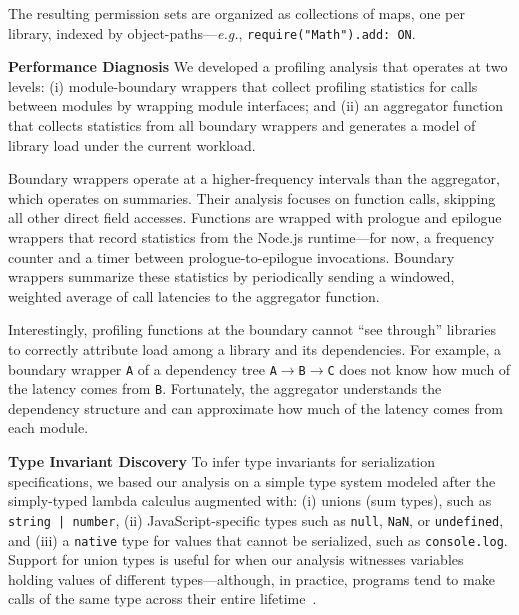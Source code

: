 \documentclass[letterpaper,twocolumn,10pt]{article}
\def\eg{{\em e.g.}, }
\newcommand{\heading}[1]{\vspace{2pt}\noindent\textbf{#1}\enspace}
\newcommand{\ttt}[1]{\texttt{#1}}
\begin{document}
The resulting permission sets are organized as collections of maps, one per library, indexed by object-paths---\eg \ttt{require("Math").add: ON}.

\heading{Performance Diagnosis}
We developed a profiling analysis that operates at two levels:
 (i) module-boundary wrappers that collect profiling statistics for calls between modules by wrapping module interfaces; and
 (ii) an aggregator function that collects statistics from all boundary wrappers and generates a model of library load under the current workload.

Boundary wrappers operate at a higher-frequency intervals than the aggregator, which operates on summaries.
Their analysis focuses on function calls, skipping all other direct field accesses.
Functions are wrapped with prologue and epilogue wrappers that record statistics from the Node.js runtime---for now, a frequency counter and a timer between prologue-to-epilogue invocations.
Boundary wrappers summarize these statistics by periodically sending a windowed, weighted average of call latencies to the aggregator function.


Interestingly, profiling functions at the boundary cannot ``see through'' libraries to correctly attribute load among a library and its dependencies.
For example, a boundary wrapper \ttt{A} of a dependency tree \ttt{A}$\rightarrow$\ttt{B}$\rightarrow$\ttt{C} does not know how much of the latency comes from \ttt{B}.
Fortunately, the aggregator understands the dependency structure and can approximate how much of the latency comes from each module.

\heading{Type Invariant Discovery}
To infer type invariants for serialization specifications, we based our analysis on a simple type system modeled after the simply-typed lambda calculus augmented with:
  (i) unions (sum types), such as \ttt{string | number}, 
  (ii) JavaScript-specific types such as \ttt{null}, \ttt{NaN}, or \ttt{undefined}, and
  (iii) a \ttt{native} type for values that cannot be serialized, such as \ttt{console.log}.
Support for union types is useful for when our analysis witnesses variables holding values of different types---although, in practice,  programs tend to make calls of the same type across their entire lifetime~\cite{daikon}.
\end{document}
